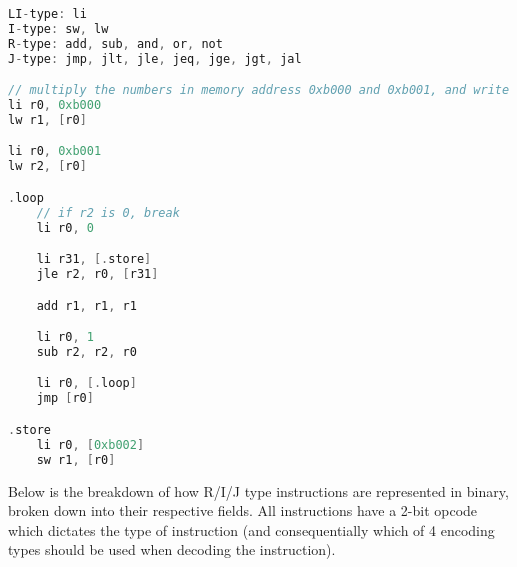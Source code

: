 \begin{lstlisting}[language=C]
LI-type: li
I-type: sw, lw
R-type: add, sub, and, or, not
J-type: jmp, jlt, jle, jeq, jge, jgt, jal

// multiply the numbers in memory address 0xb000 and 0xb001, and write the answer to 0xb002
li r0, 0xb000
lw r1, [r0]

li r0, 0xb001
lw r2, [r0]

.loop
    // if r2 is 0, break
    li r0, 0

    li r31, [.store]
    jle r2, r0, [r31]

    add r1, r1, r1

    li r0, 1
    sub r2, r2, r0

    li r0, [.loop]
    jmp [r0]

.store
    li r0, [0xb002]
    sw r1, [r0]
\end{lstlisting}


Below is the breakdown of how R/I/J type instructions are represented in binary, broken down into their respective fields. All instructions have a 2-bit opcode which dictates the type of instruction (and consequentially which of 4 encoding types should be used when decoding the instruction). 

